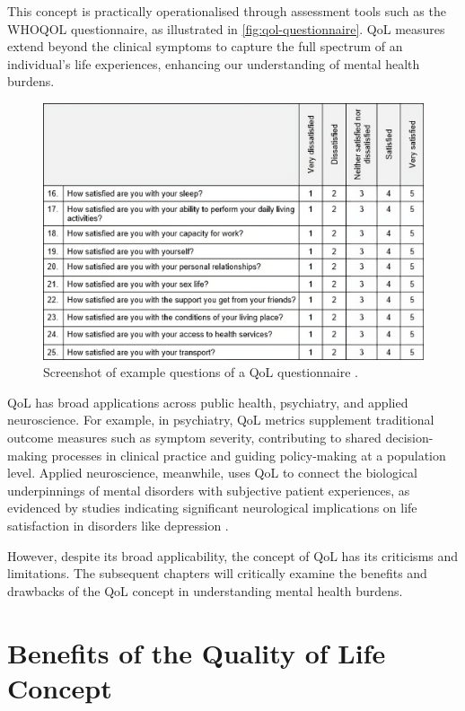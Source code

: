 \documentclass[10pt]{article}
\begin{document}
\begin{sloppypar}
  This concept is practically operationalised through assessment tools such as the WHOQOL questionnaire, as illustrated in \autoref{fig:qol-questionnaire}. QoL measures extend beyond the clinical symptoms to capture the full spectrum of an individual’s life experiences, enhancing our understanding of mental health burdens.

  \begin{figure}[ht] \centering \includegraphics[width=\textwidth]{figures/qol-questionnaire.png} \caption[Screenshot of example questions of a QoL questionnaire.]{Screenshot of example questions of a QoL questionnaire \citep{harper_development_1998}.} \label{fig:qol-questionnaire} \end{figure}

  \newpage

  QoL has broad applications across public health, psychiatry, and applied neuroscience. For example, in psychiatry, QoL metrics supplement traditional outcome measures such as symptom severity, contributing to shared decision-making processes in clinical practice and guiding policy-making at a population level. Applied neuroscience, meanwhile, uses QoL to connect the biological underpinnings of mental disorders with subjective patient experiences, as evidenced by studies indicating significant neurological implications on life satisfaction in disorders like depression \citep{zhang_brain_2016}.

  However, despite its broad applicability, the concept of QoL has its criticisms and limitations. The subsequent chapters will critically examine the benefits and drawbacks of the QoL concept in understanding mental health burdens.

  \section{Benefits of the Quality of Life Concept}
  \label{sec:benefits}


\end{sloppypar}
\end{document}
